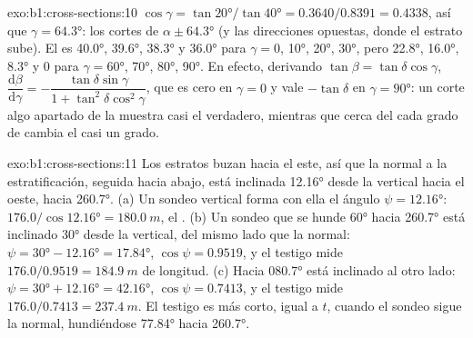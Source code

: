 \begin{solution}{exo:b1:cross-sections:10}
$\cos\gamma = \tan\ang{20}/\tan\ang{40} = 0.3640/0.8391 = 0.4338$, así que
$\gamma = \ang{64.3}$: los cortes de  $\alpha \pm \ang{64.3}$ (y las direcciones
opuestas, donde el estrato sube). El  es \ang{40.0}, \ang{39.6}, \ang{38.3} y
\ang{36.0} para $\gamma = 0$, \ang{10}, \ang{20}, \ang{30}, pero \ang{22.8}, \ang{16.0}, \ang{8.3} y
$0$ para $\gamma = \ang{60}$, \ang{70}, \ang{80}, \ang{90}. En efecto, derivando
$\tan\beta = \tan\delta\cos\gamma$,
$\dfrac{\mathrm d\beta}{\mathrm d\gamma} =
-\dfrac{\tan\delta\sin\gamma}{1 + \tan^2\delta\cos^2\gamma}$, que es cero
en $\gamma = 0$ y vale $-\tan\delta$ en $\gamma = \ang{90}$: un corte algo apartado de la  muestra casi el  verdadero, mientras que cerca del  cada grado de 
cambia el  casi un grado.
\end{solution}

\begin{solution}{exo:b1:cross-sections:11}
Los estratos buzan hacia el este, así que la normal a la estratificación, seguida hacia abajo, está
inclinada \ang{12.16} desde la vertical hacia el oeste, hacia \ang{260.7}. (a) Un sondeo vertical
forma con ella el ángulo $\psi = \ang{12.16}$: $176.0/\cos\ang{12.16} = \qty{180.0}{m}$, el . (b) Un sondeo que se hunde \ang{60} hacia \ang{260.7} está inclinado \ang{30} desde la
vertical, del mismo lado que la normal: $\psi = \ang{30} - \ang{12.16} =
\ang{17.84}$, $\cos\psi = 0.9519$, y el testigo mide $176.0/0.9519 =
\qty{184.9}{m}$ de longitud. (c) Hacia \ang{080.7} está inclinado al otro lado:
$\psi = \ang{30} + \ang{12.16} = \ang{42.16}$, $\cos\psi = 0.7413$, y el testigo mide
$176.0/0.7413 = \qty{237.4}{m}$. El testigo es más corto, igual a
$t$, cuando el sondeo sigue la normal, hundiéndose \ang{77.84} hacia \ang{260.7}.
\end{solution}

